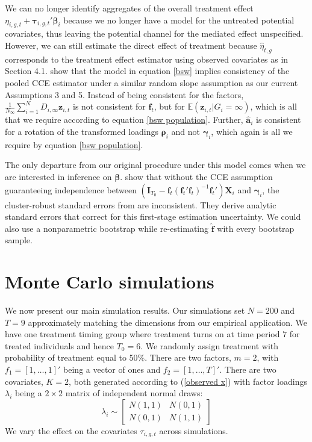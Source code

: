 \documentclass[12pt,fleqn]{article}
\def\*#1{\mathbf{#1}}
\def\+#1{\boldsymbol{#1}}
\begin{document}
We can no longer identify aggregates of the overall treatment effect $\eta_{i,g,t} + \+\tau_{i,g,t}' \+\beta_i$ because we no longer have a model for the untreated potential covariates, thus leaving the potential channel for the mediated effect unspecified. However, we can still estimate the direct effect of treatment because $\widehat{\eta}_{t,g}$ corresponds to the treatment effect estimator using observed covariates as in Section 4.1. \citet{Brown_Schmidt_Wooldridge_2021} show that the model in equation \eqref{bsw} implies consistency of the pooled CCE estimator under a similar random slope assumption as our current Assumptions 3 and 5. Instead of being consistent for the factors, $\frac{1}{N_\infty} \sum_{i = 1}^N D_{i,\infty} \*z_{i,t}$ is not consistent for $\*f_t$, but for $\mathbb{E}(\*z_{i,t}|G_i = \infty)$, which is all that we require according to equation \eqref{bsw population}. Further, $\widehat{\*a}_i$ is consistent for a rotation of the transformed loadings $\+\rho_i$ and not $\+\gamma_i$, which again is all we require by equation \eqref{bsw population}.

The only departure from our original procedure under this model comes when we are interested in inference on $\+\beta$. \citet{Brown_Schmidt_Wooldridge_2021} show that without the CCE assumption guaranteeing independence between $(\*I_{T_0} - \*f_t (\*f_t' \*f_t)^{-1} \*f_t') \*X_i$ and $\+\gamma_i$, the cluster-robust standard errors from \citet{westerlund2019cce} are inconsistent. They derive analytic standard errors that correct for this first-stage estimation uncertainty. We could also use a nonparametric bootstrap while re-estimating $\widehat{\*f}$ with every bootstrap sample.


\section{Monte Carlo simulations}

We now present our main simulation results. Our simulations set $N = 200$ and $T = 9$ approximately matching the dimensions from our empirical application. We have one treatment timing group where treatment turns on at time period $7$ for treated individuals and hence $T_0 = 6$. We randomly assign treatment with probability of treatment equal to 50\%. 
There are two factors, $m = 2$, with $f_1 = [1, \dots, 1]'$ being a vector of ones and $f_2 = [1, \dots, T]'$. There are two covariates, $K = 2$, both generated according to (\ref{observed x}) with factor loadings $\lambda_i$ being a $2 \times 2$ matrix of independent normal draws: 
$$
\lambda_i \sim
\begin{bmatrix}
    N(1, 1) & N(0, 1) \\
    N(0, 1) & N(1, 1)
\end{bmatrix}
$$
We vary the effect on the covariates $\tau_{i,g,t}$ across simulations. 
\end{document}

